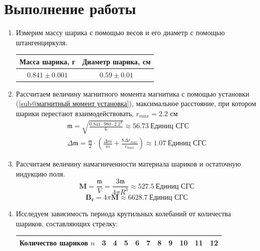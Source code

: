 \documentclass[a4paper, 12pt]{article}
\begin{document}
\section*{Выполнение работы}
\begin{enumerate}
    \item Измерим массу шарика с помощью весов и его диаметр с помощью штангенциркуля.
    \begin{table}[htbp]
        \centering
        \begin{tabular}{|c|c|}
            \hline
            Масса шарика, г & Диаметр шарика, см\\ \hline
            $0.841\pm 0.001$ & $0.59\pm 0.01$\\ \hline
        \end{tabular}
    \end{table}
    \item Рассчитаем величину магнитного момента магнитика с помощью установки (\ref{sub@магнитный момент установка}), максимальное
    расстояние, при котором шарики перестают взаимодействовать, $r_{max} = 2.2$ см
    \begin{equation*}
        \begin{aligned}
            \mathfrak{m} = \sqrt{\frac{0.841\cdot 980\cdot 2.2^{4}}{6}} \approx 56.73\ \text{Единиц СГС}\\
            \Delta \mathfrak{m} = \frac{\mathfrak{m}}{2}\cdot \left(\frac{\Delta m}{m} + \frac{8\Delta r_{max}}{r_{max}}\right) \approx 1.07\ \text{Единиц СГС}
        \end{aligned}
    \end{equation*}
    \item Рассчитаем величину намагниченности материала шариков и остаточную индукцию поля.
    \begin{equation*}
        \mathbf{M} = \frac{\mathfrak{m}}{V} = \frac{3\mathfrak{m}}{4\pi R^{3}} \approx 527.5\ \text{Единиц СГС}
    \end{equation*}
    \begin{equation*}
        \mathbf{B_{r}} = 4\pi \mathbf{M} \approx 6628.7\ \text{Единиц СГС}
    \end{equation*}
    \item Исследуем зависимость периода крутильных колебаний от количества шариков, составляющих стрелку:
    \begin{table}[htbp]
        \centering
        \begin{tabular}{|c|c|c|c|c|c|c|c|c|c|c|}
            \hline
            Количество шариков $n$ & 3 & 4 & 5 & 6 & 7 & 8 & 9 & 10 & 11 & 12\\ \hline

\end{tabular}
\end{table}
\end{enumerate}
\end{document}
